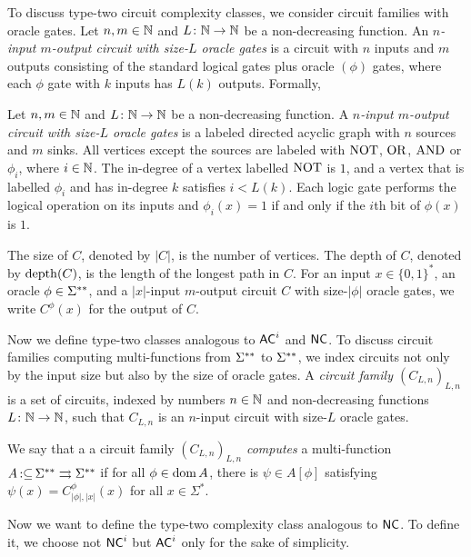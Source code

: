 \documentclass[envcountsame,orivec,oribibl]{llncs}
\newcommand{\pcolon}{\mathpunct{\,:\subseteq}}
\begin{document}
To discuss type-two circuit complexity classes,
we consider circuit families with oracle gates.
Let $n, m \in \mathbb N$ and $L \colon \mathbb N \to \mathbb N$ be a non-decreasing function.
An \emph{$n$-input $m$-output circuit with size-$L$ oracle gates} is a circuit with
$n$ inputs and $m$ outputs consisting of the standard logical gates 
plus oracle $(\phi)$ gates, 
where each $\phi$ gate with $k$ inputs has $L(k)$ outputs.
Formally, 

\begin{definition}
Let $n, m \in \mathbb N$ and $L \colon \mathbb N \to \mathbb N$ be a non-decreasing function.
A \emph{$n$-input $m$-output circuit with size-$L$ oracle gates} is 
a labeled directed acyclic graph with $n$ sources and $m$ sinks.
All vertices except the sources are labeled with $\mathrm{NOT}$, $\mathrm{OR}$, $\mathrm{AND}$ 
or $\phi _i$, where $i \in \mathbb N$.
The in-degree of a vertex labelled $\mathrm{NOT}$ is $1$, and
a vertex that is labelled $\phi _i$ and has in-degree $k$ 
satisfies $i < L(k)$.
Each logic gate performs the logical operation on its inputs
and $\phi_i(x) = 1$ if and only if the $i$th bit of $\phi(x)$ is $1$.

The size of $C$, denoted by $|C|$, is the number of vertices.
The depth of $C$, denoted by $\mathop{\rm depth}(C)$, is the length of the longest path in $C$.
For an input $x \in \{0, 1\}^*$, an oracle $\phi \in \Sigma ^{**}$, 
and a $|x|$-input $m$-output circuit $C$ with size-$|\phi|$ oracle gates, 
we write $C^\phi(x)$ for the output of $C$.
\end{definition}


Now we define type-two classes analogous to 
$\mathsf{AC}^i$ and $\mathsf{NC}$.
To discuss circuit families computing multi-functions from $\Sigma ^{**}$ to $\Sigma ^{**}$,
we index circuits not only by the input size but also by the size of oracle gates.
A {\em circuit family $(C_{L,n})_{L,n}$} is a set of circuits, 
indexed by numbers $n \in \mathbb N$ and non-decreasing functions $L \colon \mathbb N \to \mathbb N$,
such that $C_{L, n}$ is an $n$-input circuit with size-$L$ oracle gates.


\begin{definition}
 We say that a a circuit family $(C_{L,n})_{L,n}$ 
\emph{computes} a multi-function 
 $A \pcolon \LM \rightrightarrows \LM$ if for all $\phi \in \mathop{\rm dom} A$, 
 there is $\psi \in A[\phi]$ satisfying $\psi(x) = C_{|\phi|, |x|}^\phi(x)$
 for all $x \in \Sigma^*$.
\end{definition}

Now we want to define the type-two complexity class analogous to $\mathsf{NC}$.
To define it, we choose not $\mathsf{NC}^i$ but $\mathsf{AC}^i$ 
only for the sake of simplicity.
\end{document}
